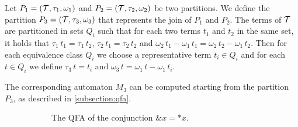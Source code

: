 Let $P_1 = (\mathcal{T}, \tau_1, \omega_1)$ and $P_2 = (\mathcal{T}, \tau_2, \omega_2)$ be two partitions.
We define the partition $P_3 = (\mathcal{T}, \tau_3, \omega_3)$ that represents the join of $P_1$ and $P_2$.
The terms of $\mathcal{T}$ are partitioned in sets $Q_i$ such that for each two terms $t_1$ and $t_2$ in the same set, it holds that $\tau_1\,t_1 = \tau_1\,t_2$, $\tau_2\,t_1 = \tau_2\,t_2$ and $\omega_2\,t_1 -\omega_1\,t_1 = \omega_2\,t_2 - \omega_1\,t_2$.
Then for each equivalence class $Q_i$ we choose a representative term $t_i\in Q_i$ and
for each $t \in Q_i$ we define $\tau_3\,t = t_i$ and $\omega_3\,t = \omega_1\,t - \omega_1\,t_i$.

The corresponding automaton $M_3$ can be computed starting from the partition $P_3$,
as described in \cref{subsection:qfa}.


\begin{example}\label{ex:join-cycle}

\begin{figure}\begin{subfigure}{0.5\textwidth}
    \centering


      \caption{The QFA of the conjunction $\&x = *x$.}\label{fig:join-diff-example}
    \end{subfigure}
    \begin{subfigure}{0.5\textwidth}
        \centering
\end{subfigure}
\end{figure}
\end{example}
